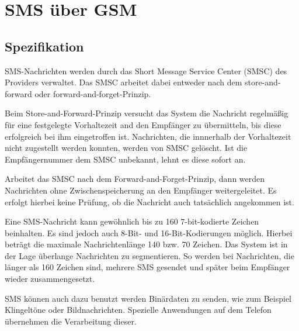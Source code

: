 \documentclass[german,12pt,a4paper]{article}
\begin{document}
\section{SMS über GSM} %
\subsection{Spezifikation}
SMS-Nachrichten werden durch das Short Message Service Center (SMSC) des 
Providers verwaltet. Das SMSC arbeitet dabei entweder nach dem store-and-forward oder 
forward-and-forget-Prinzip. 

Beim Store-and-Forward-Prinzip versucht das System 
die Nachricht regelmäßig für eine festgelegte Vorhaltezeit and den Empfänger 
zu übermitteln, bis diese erfolgreich bei ihm eingetroffen ist. Nachrichten, die innnerhalb 
der Vorhaltezeit nicht zugestellt werden konnten, werden von SMSC gelöscht. 
Ist die Empfängernummer dem SMSC unbekannt, lehnt es diese sofort an.

Arbeitet das SMSC nach dem Forward-and-Forget-Prinzip, dann werden Nachrichten ohne 
Zwischenspeicherung an den Empfänger weitergeleitet. Es erfolgt hierbei keine Prüfung, 
ob die Nachricht auch tatsächlich angekommen ist.

Eine SMS-Nachricht kann gewöhnlich bis zu 160 7-bit-kodierte Zeichen beinhalten. 
Es sind jedoch auch 8-Bit- und 16-Bit-Kodierungen möglich. Hierbei beträgt die 
maximale Nachrichtenlänge 140 bzw. 70 Zeichen. Das System ist in der Lage überlange 
Nachrichten zu segmentieren. So werden bei Nachrichten, die länger als 160 Zeichen 
sind, mehrere SMS gesendet und später beim Empfänger wieder zusammengesetzt.

SMS können auch dazu benutzt werden Binärdaten zu senden, wie zum Beispiel 
Klingeltöne oder Bildnachrichten. Spezielle Anwendungen auf 
dem Telefon übernehmen die Verarbeitung dieser.
\end{document}
